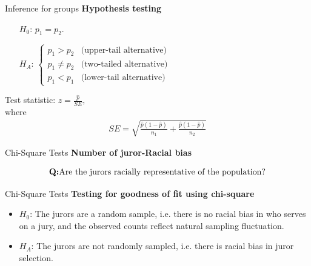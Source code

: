 \documentclass[12pt,a4paper]{beamer}
\begin{document}
		\begin{frame}{Inference for groups}
			\textbf{Hypothesis testing}
					\small\begin{itemize}
					\setlength{\itemsep}{0mm}
					\item[$H_0$:] $p_1= p_2$.
					\item[$H_A$:]$\left\{
					\begin{array}{ll}
						p_1>p_2& \text{(upper-tail alternative)}\\
						p_1\neq p_2& \text{(two-tailed alternative)}\\
						p_1< p_1& \text{(lower-tail alternative)}
					\end{array}
					\right.$
				\end{itemize}
				Test statistic: $z=\frac{\hat{p}}{SE},$\\
			where
			\begin{eqnarray*}
			SE = \sqrt{\frac{\hat{p}(1-\hat{p})}{n_1} + \frac{\hat{p}(1-\hat{p})}{n_2}} 
			\end{eqnarray*}
		\end{frame}
		\begin{frame}{Chi-Square Tests}
			\textbf{Number of juror-Racial bias}
			\begin{table}[h]
			\centering
			\end{table}
			\vspace{0.2cm}
			\[\text{\textbf{Q:}Are the jurors racially representative of the population?}\]
		\end{frame}
		\begin{frame}{Chi-Square Tests}
			\textbf{Testing for goodness of fit using chi-square}
			\begin{itemize}
			\setlength{\itemsep}{0mm}
			\item $H_0$: The jurors are a random sample, i.e. there is no racial bias in who serves on a jury, and the observed counts reflect natural sampling fluctuation.
			\item $H_A$: The jurors are not randomly sampled, i.e. there is racial bias in juror selection.
			\end{itemize}
		\end{frame}
\end{document}
